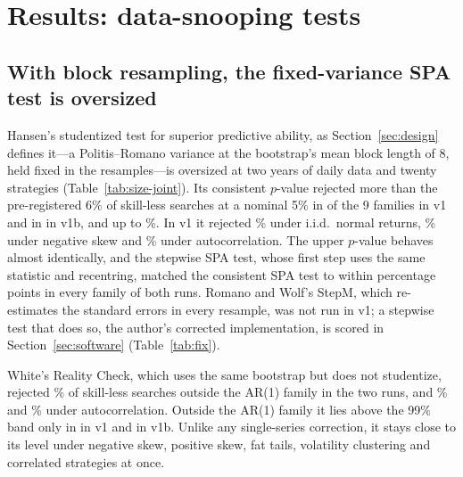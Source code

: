 \section{Results: data-snooping tests}
\label{sec:snooping}



\subsection{With block resampling, the fixed-variance SPA test is oversized}
\label{sec:spa-size}
Hansen's studentized test for superior predictive ability, as Section~\ref{sec:design} defines it---a Politis--Romano variance at the bootstrap's mean block length of 8, held fixed in the resamples---is oversized at two years of daily data and twenty strategies (Table~\ref{tab:size-joint}). Its consistent $p$-value rejected more than the pre-registered 6\% of skill-less searches at a nominal 5\% in  of the 9 families in v1 and in  in v1b, and up to \%. In v1 it rejected \% under i.i.d.\ normal returns, \% under negative skew and \% under autocorrelation. The upper $p$-value behaves almost identically, and the stepwise SPA test, whose first step uses the same statistic and recentring, matched the consistent SPA test to within  percentage points in every family of both runs. Romano and Wolf's StepM, which re-estimates the standard errors in every resample, was not run in v1; a stepwise test that does so, the author's corrected implementation, is scored in Section~\ref{sec:software} (Table~\ref{tab:fix}).

White's Reality Check, which uses the same bootstrap but does not studentize, rejected \% of skill-less searches outside the AR(1) family in the two runs, and \% and \% under autocorrelation. Outside the AR(1) family it lies above the 99\% band only in  in v1 and  in v1b. Unlike any single-series correction, it stays close to its level under negative skew, positive skew, fat tails, volatility clustering and correlated strategies at once.

